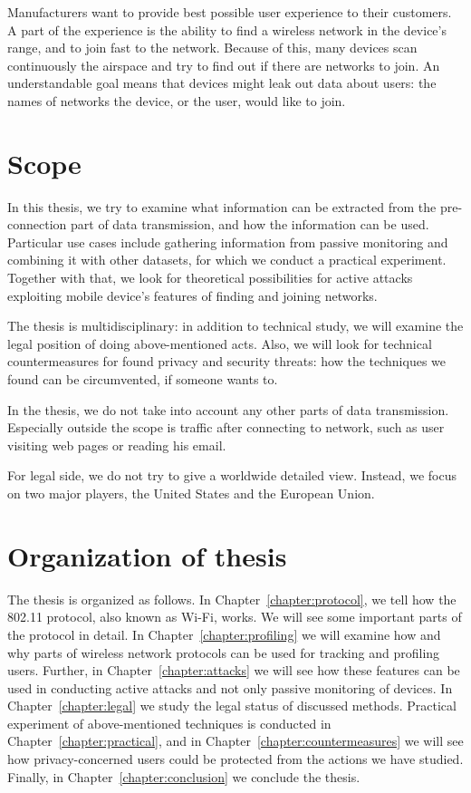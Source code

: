 \documentclass[12pt,a4paper,oneside,pdftex]{report}
\begin{document}
Manufacturers want to provide best possible user experience to their customers. A part of the experience is the ability to find a wireless network in the device's range, and to join fast to the network. Because of this, many devices scan continuously the airspace and try to find out if there are networks to join. An understandable goal means that devices might leak out data about users: the names of networks the device, or the user, would like to join.


\section{Scope}
\label{sec:scope}

In this thesis, we try to examine what information can be extracted from the pre-connection part of data transmission, and how the information can be used. Particular use cases include gathering information from passive monitoring and combining it with other datasets, for which we conduct a practical experiment. Together with that, we look for theoretical possibilities for active attacks exploiting mobile device's features of finding and joining networks.

The thesis is multidisciplinary: in addition to technical study, we will examine the legal position of doing above-mentioned acts. Also, we will look for technical countermeasures for found privacy and security threats: how the techniques we found can be circumvented, if someone wants to.

In the thesis, we do not take into account any other parts of data transmission. Especially outside the scope is traffic after connecting to network, such as user visiting web pages or reading his email.

For legal side, we do not try to give a worldwide detailed view. Instead, we focus on two major players, the United States and the European Union.

\section{Organization of thesis}

The thesis is organized as follows. In Chapter~\ref{chapter:protocol}, we tell how the 802.11 protocol, also known as Wi-Fi, works. We will see some important parts of the protocol in detail. In Chapter~\ref{chapter:profiling} we will examine how and why parts of wireless network protocols can be used for tracking and profiling users. Further, in Chapter~\ref{chapter:attacks} we will see how these features can be used in conducting active attacks and not only passive monitoring of devices.  In Chapter~\ref{chapter:legal} we study the legal status of discussed methods. Practical experiment of above-mentioned techniques is conducted in Chapter~\ref{chapter:practical}, and in Chapter~\ref{chapter:countermeasures} we will see how privacy-concerned users could be protected from the actions we have studied. Finally, in Chapter~\ref{chapter:conclusion} we conclude the thesis.
\end{document}
